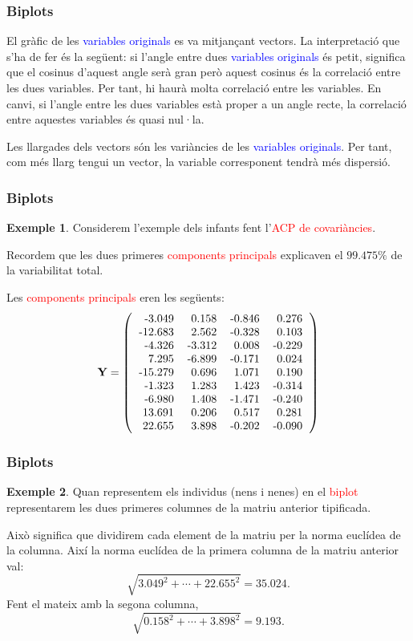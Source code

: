 \documentclass[12pt,t]{beamer}
\newcommand{\red}[1]{\textcolor{red}{#1}}
\newcommand{\blue}[1]{\textcolor{blue}{#1}}
\theoremstyle{plain}
\theoremstyle{definition}
\newtheorem{exemple}{Exemple}
\begin{document}
\begin{frame}
\frametitle{Biplots}
El gràfic de les \blue{variables originals} es va mitjançant vectors. La interpretació que s'ha de fer és la següent: si 
l'angle entre dues \blue{variables originals} és petit, significa que el cosinus d'aquest angle serà gran però aquest 
cosinus és la correlació entre les dues variables. Per tant, hi haurà molta correlació entre les variables. En canvi, si 
l'angle entre les dues variables està proper a un angle recte, la correlació entre aquestes variables és quasi nul·la.
\medskip

Les llargades dels vectors són les variàncies de les \blue{variables originals}. Per tant, com més llarg tengui un 
vector, la variable corresponent tendrà més dispersió.
\end{frame}



\begin{frame}
\frametitle{Biplots}
\begin{exemple}
Considerem l'exemple dels infants fent l'\red{ACP de covariàncies}.

Recordem que les dues primeres \red{components principals} explicaven el 
$99.475\%$ de la variabilitat total.

Les \red{components principals} eren les següents:
{\footnotesize
\[
\mathbf{Y}=
\left(
\begin{tabular}{rrrr}
  -3.049 & 0.158 & -0.846 & 0.276 \\ 
  -12.683 & 2.562 & -0.328 & 0.103 \\ 
  -4.326 & -3.312 & 0.008 & -0.229 \\ 
  7.295 & -6.899 & -0.171 & 0.024 \\ 
  -15.279 & 0.696 & 1.071 & 0.190 \\ 
  -1.323 & 1.283 & 1.423 & -0.314 \\ 
  -6.980 & 1.408 & -1.471 & -0.240 \\ 
  13.691 & 0.206 & 0.517 & 0.281 \\ 
  22.655 & 3.898 & -0.202 & -0.090 \\ 
  \end{tabular}\right)
\]
}
\end{exemple}
\end{frame}


\begin{frame}
\frametitle{Biplots}
\begin{exemple}
Quan representem els individus (nens i nenes) en el \red{biplot} representarem les dues primeres columnes de la matriu 
anterior tipificada. 

Això significa que dividirem cada element de la matriu per la norma euclídea de la columna. Així la norma euclídea de la 
primera columna de la matriu anterior val:
\[
\sqrt{3.049^2+\cdots+22.655^2}=
35.024.
\]
Fent el mateix amb la segona columna,
\[
\sqrt{0.158^2+\cdots+3.898^2}=
9.193.
\]
\end{exemple}
\end{frame}
\end{document}
